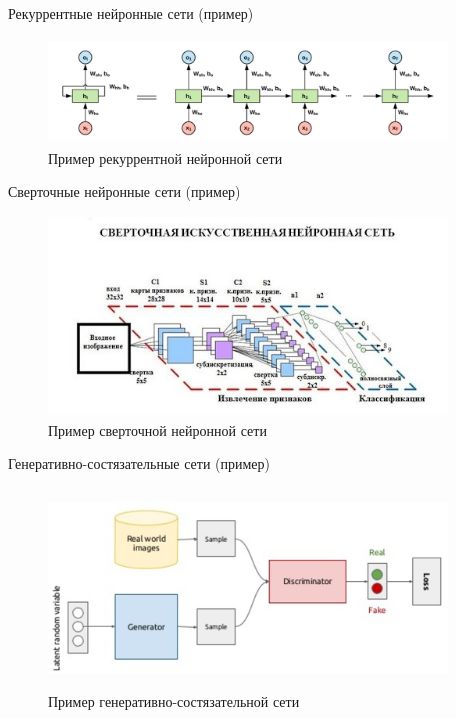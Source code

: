 \documentclass[unicode,9pt, pdf]{beamer}
\begin{document}
\begin{frame}{Рекуррентные нейронные сети (пример)}
	    \begin{figure}
	        \centering
	        \includegraphics[width=300pt, height=80pt]{rnn.png}
	        \caption{Пример рекуррентной нейронной сети}
	        \label{fig:my_label}
	    \end{figure}
	\end{frame}


	\begin{frame}{Сверточные нейронные сети (пример)}
	    \begin{figure}
	        \centering
	        \includegraphics[width=300pt, height=150pt]{cnn.jpg}
	        \caption{Пример сверточной нейронной сети}
	        \label{fig:my_label}
	    \end{figure}
	\end{frame}
	

	\begin{frame}{Генеративно-состязательные сети (пример)}
	    \begin{figure}
	        \centering
	        \includegraphics[width=300pt, height=150pt]{gan.png}
	        \caption{Пример генеративно-состязательной сети}
	        \label{fig:my_label}
	    \end{figure}
	\end{frame}
	
\end{document}
